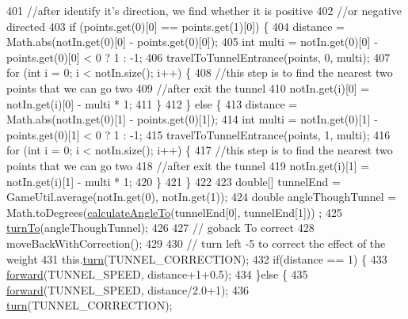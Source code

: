 \begin{DoxyCode}
401     \textcolor{comment}{//after identify it's direction, we find whether it is positive }
402     \textcolor{comment}{//or negative directed}
403     \textcolor{keywordflow}{if} (points.get(0)[0] == points.get(1)[0]) \{
404       distance = Math.abs(notIn.get(0)[0] - points.get(0)[0]);
405       \textcolor{keywordtype}{int} multi = notIn.get(0)[0] - points.get(0)[0] < 0 ? 1 : -1;
406       travelToTunnelEntrance(points, 0, multi);
407       \textcolor{keywordflow}{for} (\textcolor{keywordtype}{int} i = 0; i < notIn.size(); i++) \{
408         \textcolor{comment}{//this step is to find the nearest two points that we can go two}
409         \textcolor{comment}{//after exit the tunnel}
410         notIn.get(i)[0] = notIn.get(i)[0] - multi * 1;
411       \}
412     \} \textcolor{keywordflow}{else} \{
413       distance = Math.abs(notIn.get(0)[1] - points.get(0)[1]);
414       \textcolor{keywordtype}{int} multi = notIn.get(0)[1] - points.get(0)[1] < 0 ? 1 : -1;
415       travelToTunnelEntrance(points, 1, multi);
416       \textcolor{keywordflow}{for} (\textcolor{keywordtype}{int} i = 0; i < notIn.size(); i++) \{
417       \textcolor{comment}{//this step is to find the nearest two points that we can go two}
418       \textcolor{comment}{//after exit the tunnel}
419         notIn.get(i)[1] = notIn.get(i)[1] - multi * 1;
420       \}
421     \}
422     
423     \textcolor{keywordtype}{double}[] tunnelEnd = GameUtil.average(notIn.get(0), notIn.get(1));
424     \textcolor{keywordtype}{double} angleThoughTunnel = Math.toDegrees(\hyperlink{classca_1_1mcgill_1_1ecse211_1_1project_1_1_navigation_a4376e54162df8f123ca3b52e4fd2f38d}{calculateAngleTo}(tunnelEnd[0], tunnelEnd[1]))
      ;
425     \hyperlink{classca_1_1mcgill_1_1ecse211_1_1project_1_1_navigation_a3bbe0645f2b3b3d0986b4a707fb5a00c}{turnTo}(angleThoughTunnel);
426     
427     \textcolor{comment}{// goback To correct}
428     moveBackWithCorrection();
429 
430     \textcolor{comment}{// turn left -5 to correct the effect of the weight}
431     this.\hyperlink{classca_1_1mcgill_1_1ecse211_1_1project_1_1_navigation_ad74286ad36d333bfaf57661837457b76}{turn}(TUNNEL\_CORRECTION);
432       \textcolor{keywordflow}{if}(distance == 1) \{  
433         \hyperlink{classca_1_1mcgill_1_1ecse211_1_1project_1_1_navigation_a7c66610c5b7496ddb35d342ab2cd3f08}{forward}(TUNNEL\_SPEED, distance+1+0.5);
434       \}\textcolor{keywordflow}{else} \{
435         \hyperlink{classca_1_1mcgill_1_1ecse211_1_1project_1_1_navigation_a7c66610c5b7496ddb35d342ab2cd3f08}{forward}(TUNNEL\_SPEED, distance/2.0+1);
436         \hyperlink{classca_1_1mcgill_1_1ecse211_1_1project_1_1_navigation_ad74286ad36d333bfaf57661837457b76}{turn}(TUNNEL\_CORRECTION);

\end{DoxyCode}
